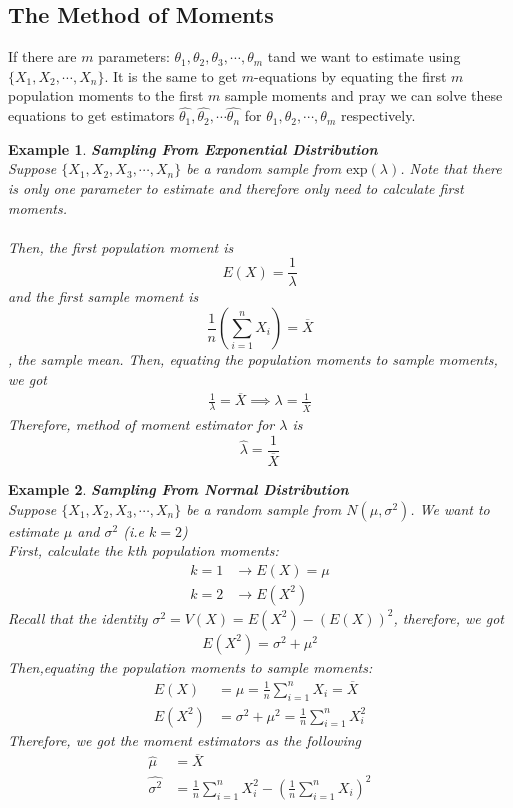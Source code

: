 \documentclass[11pt,oneside]{book}
\theoremstyle{newStyle}
\newtheorem{ex}{Example}[section]
\begin{document}
\subsection[The Method of Moments]{The Method of Moments}
If there are $m$ parameters: $\theta_1,\theta_2,\theta_3,\cdots,\theta_m$ tand we want to estimate using $\{X_1,X_2,\cdots,X_n\}$. It is the same to get $m$-equations by equating the first $m$ population moments to the first $m$ sample moments and pray we can solve these equations to get estimators $\widehat{\theta_1},\widehat{\theta_2},\cdots \widehat{\theta_n}$ for $\theta_1,\theta_2,\cdots,\theta_m$ respectively.\\
\begin{ex}
\textbf{Sampling From Exponential Distribution}\\
Suppose $\{X_1,X_2,X_3,\cdots,X_n\}$ be a random sample from $\text{exp}(\lambda)$. Note that there is only one parameter to estimate and therefore only need to calculate first moments.\\
\hfill\\
Then, the first population moment is $$E(X)=\frac{1}{\lambda}$$ and the first sample moment is $$\frac{1}{n}\left(\sum_{i=1}^nX_i \right)=\overline{X}$$, the sample mean. Then, equating the population moments to sample moments, we got \begin{align*}
\frac{1}{\lambda}=\overline{X} \implies \lambda=\frac{1}{\overline{X}}
\end{align*}
Therefore, method of moment estimator for $\lambda$ is $$\widehat{\lambda}=\frac{1}{\overline{X}}$$
\end{ex}
\begin{ex}
\textbf{Sampling From Normal Distribution}\\
Suppose $\{X_1,X_2,X_3,\cdots,X_n\}$ be a random sample from $N(\mu,\sigma^2)$. We want to estimate $\mu$ and $\sigma^2$ (i.e $k=2$)\\
First, calculate the $k$th population moments:\begin{align*}
k=1&\to E(X)=\mu\\
k=2&\to E(X^2)
\end{align*}
Recall that the identity $\sigma^2=V(X)=E(X^2)-(E(X))^2$, therefore, we got \begin{align*}
E(X^2)=\sigma^2+\mu^2
\end{align*}
Then,equating the population moments to sample moments:\begin{align*}
E(X)&=\mu =\frac{1}{n}\sum_{i=1}^nX_i=\overline{X}\\
E(X^2)&=\sigma^2+\mu^2=\frac{1}{n}\sum_{i=1}^n X_i^2
\end{align*}
Therefore, we got the moment estimators as the following \begin{align*}
\widehat{\mu}&=\overline{X}\\
\widehat{\sigma^2}&=\frac{1}{n}\sum_{i=1}^n X_i^2-\left( \frac{1}{n}\sum_{i=1}^nX_i\right)^2
\end{align*}
\end{ex}
\end{document}
